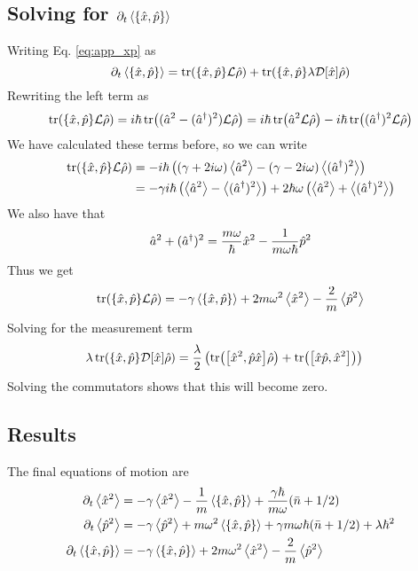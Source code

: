 \subsection{Solving for $\dt\expval{\acomm{\xop}{\pop}}$}
Writing Eq. \eqref{eq:app_xp} as
\begin{equation}
    \dt\expval{\acomm{\xop}{\pop}} = \tr(\acomm{\xop}{\pop} \liouvillian \dmatrix) + \tr(\acomm{\xop}{\pop} \lambda \super{\xop} \dmatrix)
\end{equation}
Rewriting the left term as 
\begin{equation}
    \tr(\acomm{\xop}{\pop}\liouvillian \dmatrix) = i\hbar \tr((\a^2 - (\ad)^2)\liouvillian \dmatrix) = i\hbar \tr(\a^2 \liouvillian \dmatrix) - i\hbar \tr((\ad)^2 \liouvillian \dmatrix)
\end{equation}
We have calculated these terms before, so we can write
\begin{align}
    \tr(\acomm{\xop}{\pop}\liouvillian \dmatrix) &= -i\hbar \left(  (\gamma + 2i\omega) \expval{\a^2} - (\gamma - 2 i \omega) \expval{(\ad)^2} \right)\\
    &= -\gamma  i\hbar \left( \expval{\a^2} - \expval{(\ad)^2} \right) + 2\hbar\omega \left(\expval{\a^2} + \expval{(\ad)^2} \right)
\end{align}
We also have that
\begin{equation}
    \hat{a}^2 +(\hat{a}^{\dagger})^2 = \frac{m\omega}{\hbar} \hat{x}^2 - \frac{1}{m\omega \hbar} \hat{p}^2
\end{equation}
Thus we get
\begin{equation}
    \tr(\acomm{\xop}{\pop}\liouvillian \dmatrix) =  -\gamma \expval{\acomm{\xop}{\pop}} + 2 m \omega^2 \expval{\xop^2} - \frac{2}{m} \expval{\pop^2}
\end{equation}
Solving for the measurement term
\begin{align}
    \lambda \tr(\acomm{\xop}{\pop}\super{\xop} \dmatrix) &= \frac{\lambda}{2} \left( \tr(\comm{\xop^2}{\pop\xop}\dmatrix) + \tr(\comm{\xop\pop}{\xop^2}) \right)
\end{align}
Solving the commutators shows that this will become zero.

\subsection{Results}
The final equations of motion are
\begin{align}
    \dt\expval{\xop^2} &= - \gamma \expval{\xop^2} - \frac{1}{m}\expval{\acomm{\xop}{\pop}} + \frac{\gamma \hbar}{m\omega}(\nbar + 1/2)\\
    \dt\expval{\pop^2} &= -\gamma \expval{\pop^2} + m\omega^2 \expval{\acomm{\xop}{\pop}} + \gamma m \omega\hbar (\nbar + 1/2) + \lambda \hbar^2\\
    \dt\expval{\acomm{\xop}{\pop}} &= -\gamma \expval{\acomm{\xop}{\pop}} + 2 m \omega^2 \expval{\xop^2} - \frac{2}{m} \expval{\pop^2}
\end{align}